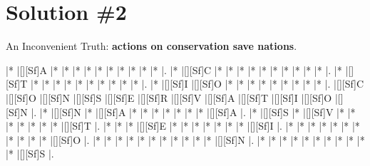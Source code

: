 \documentclass[letterpaper]{article}
\begin{document}
\newpage

\section*{Solution \#2}

An Inconvenient Truth: \textbf{actions on conservation save nations}.

\vspace*{1em}
\begin{Puzzle}{12}{11}
|*        |[][Sf]A  |*        |*        |*        |*        |*        |*        |*        |*        |*        |*        |. 
|*        |[][Sf]C  |*        |*        |*        |*        |*        |*        |*        |*        |*        |*        |.  
|*        |[][Sf]T  |*        |*        |*        |*        |*        |*        |*        |*        |*        |*        |.
|*        |[][Sf]I  |[][Sf]O  |*        |*        |*        |*        |*        |*        |*        |*        |*        |.  
|[][Sf]C  |[][Sf]O  |[][Sf]N  |[][Sf]S  |[][Sf]E  |[][Sf]R  |[][Sf]V  |[][Sf]A  |[][Sf]T  |[][Sf]I  |[][Sf]O  |[][Sf]N  |.
|*        |[][Sf]N  |*        |[][Sf]A  |*        |*        |*        |*        |*        |*        |*        |[][Sf]A  |. 
|*        |[][Sf]S  |*        |[][Sf]V  |*        |*        |*        |*        |*        |*        |*        |[][Sf]T  |.
|*        |*        |*        |[][Sf]E  |*        |*        |*        |*        |*        |*        |*        |[][Sf]I  |.
|*        |*        |*        |*        |*        |*        |*        |*        |*        |*        |*        |[][Sf]O  |.
|*        |*        |*        |*        |*        |*        |*        |*        |*        |*        |*        |[][Sf]N  |.
|*        |*        |*        |*        |*        |*        |*        |*        |*        |*        |*        |[][Sf]S  |.
\end{Puzzle}

\newpage
\end{document}
